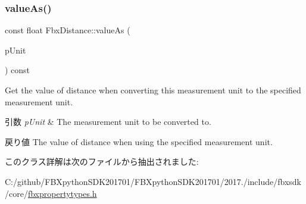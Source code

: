 \subsubsection{\texorpdfstring{value\+As()}{valueAs()}}
{\footnotesize\ttfamily const float Fbx\+Distance\+::value\+As (\begin{DoxyParamCaption}\item[{const \hyperlink{class_fbx_system_unit}{Fbx\+System\+Unit} \&}]{p\+Unit }\end{DoxyParamCaption}) const}

Get the value of distance when converting this measurement unit to the specified measurement unit. 
\begin{DoxyParams}{引数}
{\em p\+Unit} & The measurement unit to be converted to. \\
\hline
\end{DoxyParams}
\begin{DoxyReturn}{戻り値}
The value of distance when using the specified measurement unit. 
\end{DoxyReturn}


このクラス詳解は次のファイルから抽出されました\+:\begin{DoxyCompactItemize}
\item 
C\+:/github/\+F\+B\+Xpython\+S\+D\+K201701/\+F\+B\+Xpython\+S\+D\+K201701/2017./include/fbxsdk/core/\hyperlink{fbxpropertytypes_8h}{fbxpropertytypes.\+h}\end{DoxyCompactItemize}
